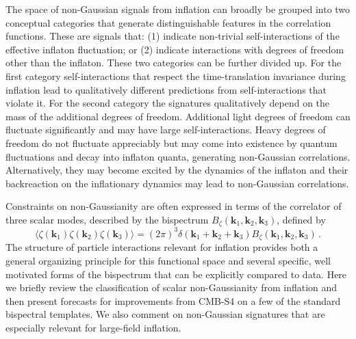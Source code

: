 The space of non-Gaussian signals from inflation can broadly be grouped into two conceptual categories that generate distinguishable features in the correlation functions. These are signals that: (1) indicate non-trivial self-interactions of the effective inflaton fluctuation; or (2) indicate interactions with degrees of freedom other than the inflaton. These two categories can be further divided up. For the first category self-interactions that respect the time-translation invariance during inflation lead to qualitatively different predictions from self-interactions that violate it. For the second category the signatures qualitatively depend on the mass of the additional degrees of freedom. Additional light degrees of freedom can fluctuate significantly and may have large self-interactions. Heavy degrees of freedom do not fluctuate appreciably but may come into existence by quantum fluctuations and decay into inflaton quanta, generating non-Gaussian correlations. Alternatively, they may become excited by the dynamics of the inflaton and their backreaction on the inflationary dynamics may lead to non-Gaussian correlations. 


Constraints on non-Gaussianity are often expressed in terms of the correlator of three scalar modes, described by the bispectrum $B_{\zeta}(\mathbf{k}_1,\mathbf{k}_2,\mathbf{k}_3)$, defined by
\begin{equation}
\label{eq:Bsss}
\langle\zeta(\mathbf{k}_1)\zeta(\mathbf{k}_2)\zeta(\mathbf{k}_3)\rangle=(2\pi)^3\delta(\mathbf{k}_1+\mathbf{k}_2+\mathbf{k}_3)B_{\zeta}(\mathbf{k}_1,\mathbf{k}_2,\mathbf{k}_3)\,.
\end{equation}
The structure of particle interactions relevant for inflation provides both a general organizing principle for this functional space and several specific, well motivated forms of the bispectrum that can be explicitly compared to data. Here we briefly review the classification of scalar non-Gaussianity from inflation and then present forecasts for improvements from CMB-S4 on a few of the standard bispectral templates. We also comment on non-Gaussian signatures that are especially relevant for large-field inflation.

